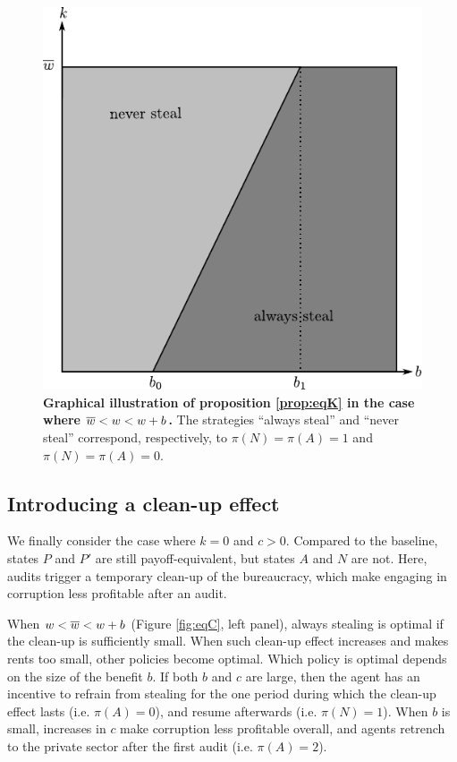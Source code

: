 {\begin{figure}[H]
    \centering
    \includegraphics{chapters/chapter_2/figures_theory/eq_with_k.pdf}
    \caption{{\bf Graphical illustration of proposition \ref{prop:eqK} in the case where $\overline{w} < w < w+b$.} The strategies ``always steal'' and ``never steal'' correspond, respectively, to $\pi(N) = \pi(A) = 1$ and $\pi(N) = \pi(A) = 0$.}
    \label{fig:eqK}
\end{figure}

\subsection{Introducing a clean-up effect}

We finally consider the case where $k = 0$ and $c > 0$. Compared to the baseline, states $P$ and $P'$ are still payoff-equivalent, but states $A$ and $N$ are not. Here, audits trigger a temporary clean-up of the bureaucracy, which make engaging in corruption less profitable after an audit. 

When $w < \overline{w} < w+b$ (Figure \ref{fig:eqC}, left panel), always stealing is optimal if the clean-up is sufficiently small. When such clean-up effect increases and makes rents too small, other policies become optimal. Which policy is optimal depends on the size of the benefit $b$. If both $b$ and $c$ are large, then the agent has an incentive to refrain from stealing for the one period during which the clean-up effect lasts (i.e. $\pi(A) = 0$), and resume afterwards (i.e. $\pi(N) = 1$). When $b$ is small, increases in $c$ make corruption less profitable overall, and agents retrench to the private sector after the first audit (i.e. $\pi(A) = 2$). 

}
